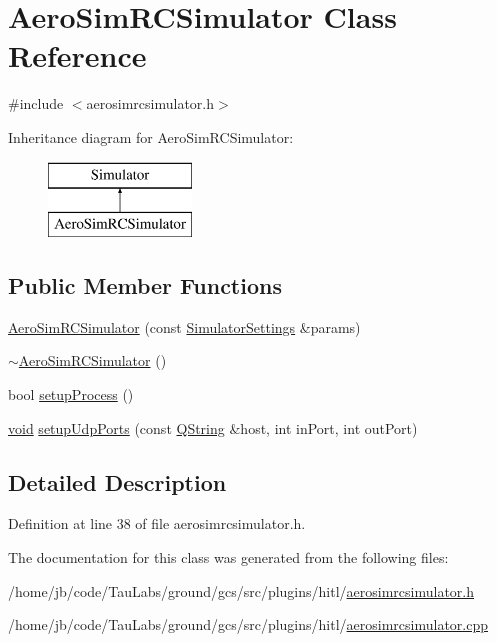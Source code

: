 \hypertarget{class_aero_sim_r_c_simulator}{\section{\-Aero\-Sim\-R\-C\-Simulator \-Class \-Reference}
\label{class_aero_sim_r_c_simulator}
}


{\ttfamily \#include $<$aerosimrcsimulator.\-h$>$}

\-Inheritance diagram for \-Aero\-Sim\-R\-C\-Simulator\-:\begin{figure}[H]
\begin{center}
\leavevmode
\includegraphics[height=2.000000cm]{class_aero_sim_r_c_simulator}
\end{center}
\end{figure}
\subsection*{\-Public \-Member \-Functions}
\begin{DoxyCompactItemize}
\item 
\hyperlink{group___h_i_t_l_plugin_ga0f5306deb22a08981f652dbb154f3e55}{\-Aero\-Sim\-R\-C\-Simulator} (const \hyperlink{group___h_i_t_l_plugin_ga052199f1328d3002bce3e45345aa7f4e}{\-Simulator\-Settings} \&params)
\item 
\hyperlink{group___h_i_t_l_plugin_ga8627049b9a905adb162384c682255bd3}{$\sim$\-Aero\-Sim\-R\-C\-Simulator} ()
\item 
bool \hyperlink{group___h_i_t_l_plugin_gae47d5533f13e5ad9a6095ba2bc61bade}{setup\-Process} ()
\item 
\hyperlink{group___u_a_v_objects_plugin_ga444cf2ff3f0ecbe028adce838d373f5c}{void} \hyperlink{group___h_i_t_l_plugin_ga593e2c3f1a4b5e541f32668be73ece6d}{setup\-Udp\-Ports} (const \hyperlink{group___u_a_v_objects_plugin_gab9d252f49c333c94a72f97ce3105a32d}{\-Q\-String} \&host, int in\-Port, int out\-Port)
\end{DoxyCompactItemize}


\subsection{\-Detailed \-Description}


\-Definition at line 38 of file aerosimrcsimulator.\-h.



\-The documentation for this class was generated from the following files\-:\begin{DoxyCompactItemize}
\item 
/home/jb/code/\-Tau\-Labs/ground/gcs/src/plugins/hitl/\hyperlink{aerosimrcsimulator_8h}{aerosimrcsimulator.\-h}\item 
/home/jb/code/\-Tau\-Labs/ground/gcs/src/plugins/hitl/\hyperlink{aerosimrcsimulator_8cpp}{aerosimrcsimulator.\-cpp}\end{DoxyCompactItemize}
